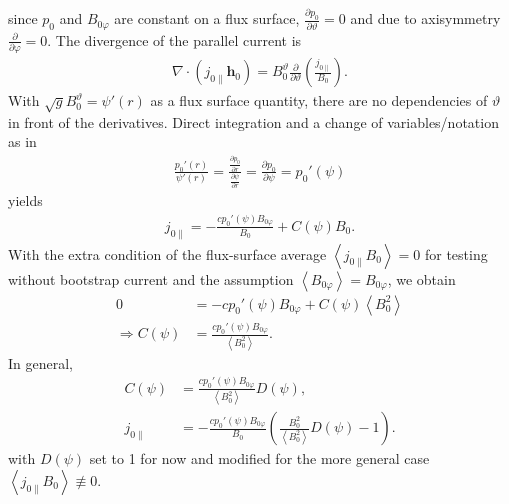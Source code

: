\documentclass[a4paper, 10pt, english]{article}
\let\temp\vartheta
\let\vartheta\theta
\let\theta\temp
\let\temp\varphi
\let\varphi\phi
\let\phi\temp
\let\vec\symbf
\newcommand*\pd[2][]{\ensuremath{\frac{\partial #1}{\partial #2}}}
\begin{document}
since $p_{0}$ and $B_{0 \phi}$ are constant on a flux surface, $\pd[p_{0}]{\theta} = 0$ and due to axisymmetry $\pd{\phi} = 0$. The divergence of the parallel current is
\begin{gather}
  \nabla \cdot(j_{0 \parallel} \vec{h}_{0}) = B_{0}^{\theta} \pd{\theta} \left( \frac{j_{0 \parallel}}{B_{0}} \right).
\end{gather}
With $\sqrt{g} B_{0}^{\theta} = \psi'(r)$ as a flux surface quantity, there are no dependencies of $\theta$ in front of the derivatives. Direct integration and a change of variables/notation as in
\begin{gather}
  \frac{p_{0}'(r)}{\psi'(r)} = \frac{\pd[p_{0}]{r}}{\pd[\psi]{r}} = \pd[p_{0}]{\psi} = p_{0}'(\psi)
\end{gather}
yields
\begin{gather}
  j_{0 \parallel} = -\frac{c p_{0}'(\psi) B_{0 \phi}}{B_{0}} + C(\psi) B_{0}.
\end{gather}
With the extra condition of the flux-surface average $\left\langle j_{0 \parallel} B_{0} \right\rangle = 0$ for testing without bootstrap current and the assumption $\left\langle B_{0 \phi} \right\rangle = B_{0 \phi}$, we obtain
\begin{align}
  0 &= -c p_{0}'(\psi) B_{0 \phi} + C(\psi) \left\langle B_{0}^{2} \right\rangle \nonumber \\
  \Rightarrow C(\psi) &= \frac{c p_{0}'(\psi) B_{0 \phi}}{\left\langle B_{0}^{2} \right\rangle}.
\end{align}
In general, 
\begin{align}
  C(\psi) &= \frac{c p_{0}'(\psi) B_{0 \phi}}{\left\langle B_{0}^{2} \right\rangle} D(\psi), \\
  j_{0 \parallel} &= -\frac{c p_{0}'(\psi) B_{0 \phi}}{B_{0}} \left( \frac{B_{0}^{2}}{\left\langle B_{0}^{2} \right\rangle} D(\psi) - 1 \right).
\end{align}
with $D(\psi)$ set to 1 for now and modified for the more general case $\left\langle j_{0 \parallel} B_{0} \right\rangle \not\equiv 0$.
\end{document}
